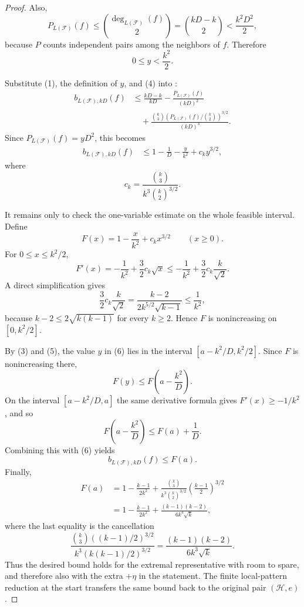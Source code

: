 \begin{proof}
Also,
\[
P_{L(\mathcal F)}(f)\le \binom{\deg_{L(\mathcal F)}(f)}2
=\binom{kD-k}{2}<\frac{k^2D^2}{2},
\]
because $P$ counts independent pairs among the neighbors of $f$.  Therefore
\[
0\le y<\frac{k^2}{2}. \tag{5}
\]

Substitute (1), the definition of $y$, and (4) into
:
\[
\begin{aligned}
b_{L(\mathcal F),kD}(f)
&\le
\frac{kD-k}{kD}
-\frac{P_{L(\mathcal F)}(f)}{(kD)^2}\\
&\quad+
\frac{\binom{k}{3}
\left(P_{L(\mathcal F)}(f)/\binom{k}{2}\right)^{3/2}}
{(kD)^3}.
\end{aligned}
\]
Since $P_{L(\mathcal F)}(f)=yD^2$, this becomes
\[
\begin{aligned}
b_{L(\mathcal F),kD}(f)
&\le
1-\frac1D-\frac{y}{k^2}
+c_k y^{3/2}, \tag{6}
\end{aligned}
\]
where
\[
c_k=\frac{\binom{k}{3}}{k^3\binom{k}{2}^{3/2}} .
\]

It remains only to check the one-variable estimate on the whole feasible
interval.  Define
\[
F(x)=1-\frac{x}{k^2}+c_k x^{3/2}
\qquad (x\ge0).
\]
For $0\le x\le k^2/2$,
\[
F'(x)=-\frac1{k^2}+\frac32 c_k\sqrt{x}
\le
-\frac1{k^2}+\frac32 c_k\frac{k}{\sqrt2}.
\]
A direct simplification gives
\[
\frac32 c_k\frac{k}{\sqrt2}
=\frac{k-2}{2k^{5/2}\sqrt{k-1}}
\le \frac1{k^2},
\]
because $k-2\le 2\sqrt{k(k-1)}$ for every $k\ge2$.  Hence $F$ is
nonincreasing on $[0,k^2/2]$.

By (3) and (5), the value $y$ in (6) lies in the interval
$[a-k^2/D,k^2/2]$.  Since $F$ is nonincreasing there,
\[
F(y)\le F\left(a-\frac{k^2}{D}\right).
\]
On the interval $[a-k^2/D,a]$ the same derivative formula gives
$F'(x)\ge -1/k^2$, and so
\[
F\left(a-\frac{k^2}{D}\right)
\le F(a)+\frac1D.
\]
Combining this with (6) yields
\[
b_{L(\mathcal F),kD}(f)\le F(a).
\]
Finally,
\[
\begin{aligned}
F(a)
&=
1-\frac{k-1}{2k^2}
+\frac{\binom{k}{3}}{k^3\binom{k}{2}^{3/2}}
\left(\frac{k-1}{2}\right)^{3/2}\\
&=
1-\frac{k-1}{2k^2}
+\frac{(k-1)(k-2)}{6k^3\sqrt{k}},
\end{aligned}
\]
where the last equality is the cancellation
\[
\frac{\binom{k}{3}\left((k-1)/2\right)^{3/2}}
{k^3\left(k(k-1)/2\right)^{3/2}}
=\frac{(k-1)(k-2)}{6k^3\sqrt{k}}.
\]
Thus the desired bound holds for the extremal representative with room to
spare, and therefore also with the extra $+\eta$ in the statement.  The
finite local-pattern reduction at the start transfers the same bound back to
the original pair $(\mathcal H,e)$.
\end{proof}
